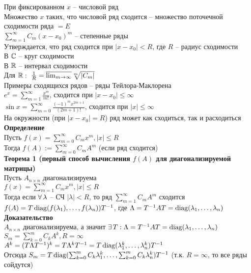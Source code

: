 \documentclass[12pt]{article}
\begin{document}
При фиксированном $x$ -- числовой ряд\\
Множество $x$ таких, что числовой ряд сходится -- множество поточечной сходимости ряда $= E$\\
$\sum_{m=1}^\infty C_m (x-x_0)^m$ -- степенные ряды\\
Утверждается, что ряд сходится при $|x-x_0| < R$, где $R$ -- радиус сходимости\\
В $\mathbb{C}$ -- круг сходимости\\
В $\mathbb{R}$ -- интервал сходимости\\
Для $\mathbb{R}:\ \frac1R = \overline{\lim_{m\rightarrow \infty}} \sqrt[m]{|C_m|}$\\
Примеры сходящихся рядов -- ряды Тейлора-Маклорена\\
$e^x = \sum_{m=1}^\infty \frac{x^m}{m!}$, сходится при $|x-x_0| \leq \infty$\\
$\sin x = \sum_{m=0}^\infty \frac{(-1)^m x^{2m+1}}{(2m+1)!}$, сходится при $|x| \leq \infty$\\
На окружности (при $|x-x_0| = R$) ряд может как сходиться, так и расходиться\\
\textbf{Определение}\\
Пусть $f(x) = \sum_{m=0}^\infty C_m x^m, |x| \leq R$\\
Тогда $f(A):= \sum_{m=0}^\infty C_m A^m$ (если ряд сходится)\\
\textbf{Теорема 1 (первый способ вычисления $f(A)$ для диагонализируемой матрицы)}\\
Пусть $A_{n\times n}$ диагонализируема\\
$f(x) = \sum_{m=1}^\infty C_m x^m, |x| \leq R$\\
Тогда если $\forall\, \lambda$ -- СЧ $|\lambda| < R$, то ряд $\sum_{m=1}^\infty C_m A^m$ сходится\\
$f(A) = T\operatorname{diag}(f(\lambda_1), \ldots, f(\lambda_n))T^{-1}$, где $\Lambda = T^{-1}AT = \operatorname{diag}(\lambda_1, \ldots, \lambda_n)$\\
\textbf{Доказательство}\\
$A_{n\times n}$ диагонализируема, а значит $\exists\, T: \Lambda = T^{-1}AT = \operatorname{diag}(\lambda_1, \ldots, \lambda_n)$\\
$S_m = \sum_{k = 0}^m C_k A^k, R = \infty$\\
$A^k = (T \Lambda T^{-1})^k = T \Lambda^k T^{-1} = T\operatorname{diag}(\lambda_1^k, \ldots, \lambda_n^k)T^{-1}$\\
Отсюда $S_m = T\operatorname{diag}(\sum_{k=0}^m C_k\lambda_1^k, \ldots, \sum_{k=0}^m C_k\lambda_n^k)T^{-1}$ (т.к. $R = \infty$, то все ряды сойдутся)\\
\end{document}
